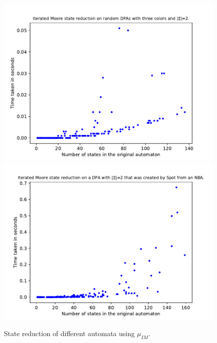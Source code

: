 \begin{figure}
\begin{minipage}{0.49\textwidth}
		\caption{State reduction of different automata using $\mu_{IM}$.}
		\label{fig:imoore:empirical_size_hist}
	\end{minipage}
	\hfill
	\begin{minipage}{0.49\textwidth}
		\includegraphics[page=2,height=.3\textheight]{../data/analysis/iterated_moore/gendet_ap1.pdf} 
		\includegraphics[page=2,height=.3\textheight]{../data/analysis/iterated_moore/detspot_ap1.pdf} 

\end{minipage}
\end{figure}
